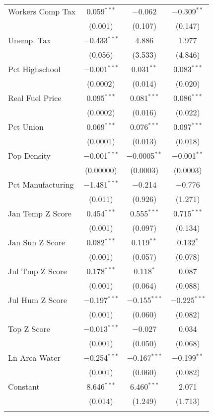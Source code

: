 \begin{table}[!htbp]
\begin{tabular}{@{\extracolsep{5pt}}lccc}
  Workers Comp Tax & 0.059$^{***}$ & $-$0.062 & $-$0.309$^{**}$ \\ 
  & (0.001) & (0.107) & (0.147) \\ 
  Unemp. Tax & $-$0.433$^{***}$ & 4.886 & 1.977 \\ 
  & (0.056) & (3.533) & (4.846) \\ 
  Pct Highschool & $-$0.001$^{***}$ & 0.031$^{**}$ & 0.083$^{***}$ \\ 
  & (0.0002) & (0.014) & (0.020) \\ 
  Real Fuel Price & 0.095$^{***}$ & 0.081$^{***}$ & 0.086$^{***}$ \\ 
  & (0.0002) & (0.016) & (0.022) \\ 
  Pct Union & 0.069$^{***}$ & 0.076$^{***}$ & 0.097$^{***}$ \\ 
  & (0.0001) & (0.013) & (0.018) \\ 
  Pop Density & $-$0.001$^{***}$ & $-$0.0005$^{**}$ & $-$0.001$^{**}$ \\ 
  & (0.00000) & (0.0003) & (0.0003) \\ 
  Pct Manufacturing & $-$1.481$^{***}$ & $-$0.214 & $-$0.776 \\ 
  & (0.011) & (0.926) & (1.271) \\ 
  Jan Temp Z Score & 0.454$^{***}$ & 0.555$^{***}$ & 0.715$^{***}$ \\ 
  & (0.001) & (0.097) & (0.134) \\ 
  Jan Sun Z Score & 0.082$^{***}$ & 0.119$^{**}$ & 0.132$^{*}$ \\ 
  & (0.001) & (0.057) & (0.078) \\ 
  Jul Tmp Z Score & 0.178$^{***}$ & 0.118$^{*}$ & 0.087 \\ 
  & (0.001) & (0.064) & (0.088) \\ 
  Jul Hum Z Score & $-$0.197$^{***}$ & $-$0.155$^{***}$ & $-$0.225$^{***}$ \\ 
  & (0.001) & (0.060) & (0.082) \\ 
  Top Z Score & $-$0.013$^{***}$ & $-$0.027 & 0.034 \\ 
  & (0.001) & (0.050) & (0.068) \\ 
  Ln Area Water & $-$0.254$^{***}$ & $-$0.167$^{***}$ & $-$0.199$^{**}$ \\ 
  & (0.001) & (0.060) & (0.082) \\ 
  Constant & 8.646$^{***}$ & 6.460$^{***}$ & 2.071 \\ 
  & (0.014) & (1.249) & (1.713) \\ 
 \hline \\[-1.8ex] 

\end{tabular}
\end{table}
